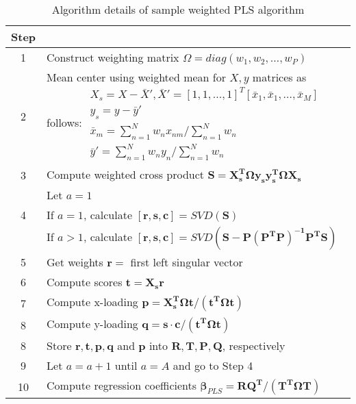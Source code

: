 \begin{table}[htbp]
  \centering
  \caption{Algorithm details of sample weighted PLS algorithm}
  \begin{tabular}{cp{5in}}
    \toprule
    Step  & \\
    \midrule
    1 &  Construct weighting matrix $\Omega = diag(w_1,w_2,\ldots,w_P)$\\
    2 &  Mean center using weighted mean for $X, y$ matrices as follows:
$\begin{array}{l}
X_s = X - \bar X' ,{\bar X'} = {\left[ {1,1,...,1} \right]^T}\left[ {{{\bar x}_1},{{\bar x}_1}, \ldots ,{{\bar x}_M}} \right]\\
y_s = y - \bar y' \\
{{\bar x}_m} = \sum\limits_{n = 1}^N {{w_n}{x_{nm}}/\sum\limits_{n = 1}^N {{w_n}} }\\
\bar y' = \sum\limits_{n = 1}^N {{w_n}{y_n}} /\sum\limits_{n = 1}^N {{w_n}}\end{array}$\\
    3 &  Compute weighted cross product $\mathbf{ S = X_s^T\Omega {y_s}y_s^T\Omega {X_s}}$\\
      & Let $a = 1$\\
    4 & If $a = 1$, calculate $\mathbf{[r,s,c]} = SVD(\mathbf S)$ \\
      & If $a > 1$, calculate $\mathbf{[r,s,c]} = SVD(\mathbf{S-P(P^TP)^{-1}P^TS})$\\
    5 & Get weights $\mathbf r = $ first left singular vector \\
    6 & Compute scores $\mathbf{t = X_s r}$ \\
    7 & Compute x-loading $\mathbf{p = X_s^T \Omega t / (t^T \Omega t)}$ \\
    8 & Compute y-loading $\mathbf{q = s \cdot c / (t^T \Omega t)}$ \\
    8 & Store $\mathbf{r,t,p,q}$ and $\mathbf p$ into $\mathbf{R,T,P,Q}$, respectively\\
    9 & Let $a = a+1$ until $a = A$ and go to Step 4 \\
    10 & Compute regression coefficients $\mathbf{\beta}_{PLS} = \mathbf{RQ^T/(T^T \Omega T)}$  \\
    \bottomrule
  \end{tabular}%
  \label{tab:weighted_PLS}%
\end{table}
